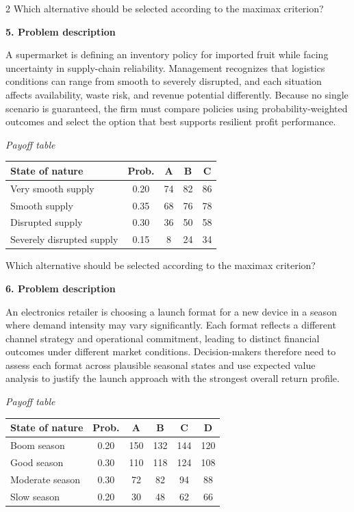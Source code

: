 \documentclass[12pt]{article}
\newcommand{\SubsectionBox}[1]{%
	\noindent\colorbox{gray!30}{%
		\parbox{\linewidth}{\textbf{#1}}%
	}\par\vspace{0.35cm}%
}
\begin{document}
\begin{multicols}{2}
				Which alternative should be selected according to the maximax criterion?

		\vspace{0.25cm}
		\SubsectionBox{5. Problem description}\vspace{-0.25cm}
		A supermarket is defining an inventory policy for imported fruit while facing uncertainty in supply-chain reliability. Management recognizes that logistics conditions can range from smooth to severely disrupted, and each situation affects availability, waste risk, and revenue potential differently. Because no single scenario is guaranteed, the firm must compare policies using probability-weighted outcomes and select the option that best supports resilient profit performance.
		
				\begin{center}
					\textit{Payoff table} \par
					\begin{tabular}{l c c c c}
						\toprule
						State of nature & Prob. &  A & B & C \\
						\midrule
						Very smooth supply & 0.20 & 74 & 82 & 86 \\
						Smooth supply & 0.35 & 68 & 76 & 78 \\
						Disrupted supply & 0.30 & 36 & 50 & 58 \\
						Severely disrupted supply & 0.15 & 8 & 24 & 34 \\
						\bottomrule
					\end{tabular}
				\end{center}
		
				Which alternative should be selected according to the maximax criterion?

		\vspace{0.25cm}
		\SubsectionBox{6. Problem description}\vspace{-0.25cm}
		An electronics retailer is choosing a launch format for a new device in a season where demand intensity may vary significantly. Each format reflects a different channel strategy and operational commitment, leading to distinct financial outcomes under different market conditions. Decision-makers therefore need to assess each format across plausible seasonal states and use expected value analysis to justify the launch approach with the strongest overall return profile.
		
				\begin{center}
					\textit{Payoff table} \par
					\begin{tabular}{l c c c c c}
						\toprule
						State of nature & Prob. & A & B & C & D \\
						\midrule
						Boom season & 0.20 & 150 & 132 & 144 & 120 \\
						Good season & 0.30 & 110 & 118 & 124 & 108 \\
						Moderate season & 0.30 & 72 & 82 & 94 & 88 \\
						Slow season & 0.20 & 30 & 48 & 62 & 66 \\
						\bottomrule
					\end{tabular}
				\end{center}
		

\end{multicols}
\end{document}
